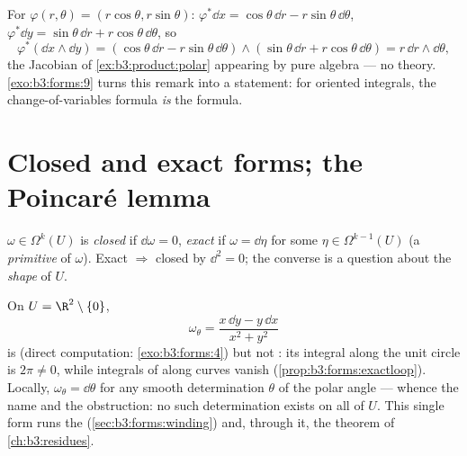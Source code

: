 \begin{example}\label{ex:b3:forms:polar}
For $\varphi(r, \theta) = (r\cos\theta, r\sin\theta)$:
$\varphi^*\dd x = \cos\theta\,\dd r -
r\sin\theta\,\dd\theta$, $\varphi^*\dd y = \sin\theta\,\dd r
+ r\cos\theta\,\dd\theta$, so
\[
\varphi^*(\dd x \wedge \dd y) =
(\cos\theta\,\dd r - r\sin\theta\,\dd\theta) \wedge
(\sin\theta\,\dd r + r\cos\theta\,\dd\theta)
= r\,\dd r \wedge \dd\theta,
\]
the Jacobian of \cref{ex:b3:product:polar} appearing by pure
algebra --- no  theory. \cref{exo:b3:forms:9} turns
this remark into a statement: for oriented integrals, the
change-of-variables formula \emph{is} the  formula.
\end{example}

\section{Closed and exact forms; the Poincar\'e lemma}

\begin{definition}\label{def:b3:forms:closedexact}
$\omega \in \Omega^k(U)$ is \emph{closed}
if $\dd\omega = 0$, \emph{exact} if
$\omega = \dd\eta$ for some $\eta \in \Omega^{k-1}(U)$ (a
\emph{primitive} of $\omega$). Exact $\Rightarrow$ closed by
$\dd^2 = 0$; the converse is a question about the
\emph{shape} of $U$.
\end{definition}

\begin{example}\label{ex:b3:forms:angular}
On $U = \R^2 \setminus \{0\}$,
\[
\omega_\theta = \frac{x\,\dd y - y\,\dd x}{x^2 + y^2}
\]
is  (direct computation:
\cref{exo:b3:forms:4}) but not : its integral along the
unit circle is $2\pi \neq 0$, while integrals of 
along  curves vanish (\cref{prop:b3:forms:exactloop}).
Locally, $\omega_\theta = \dd\theta$ for any smooth
determination $\theta$ of the polar angle --- whence the
name and the obstruction: no such determination exists on
all of $U$. This single form runs the 
(\cref{sec:b3:forms:winding}) and, through it, the 
theorem of \cref{ch:b3:residues}.
\end{example}

